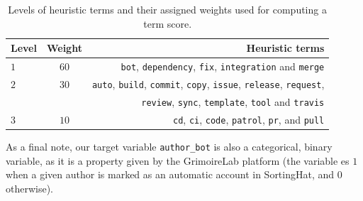 \documentclass[a4paper, 12pt]{book}
\begin{document}
\begin{table}[htb]  %
 \renewcommand{\arraystretch}{1.2}  %
 \begin{center}
  \begin{tabular}{ l c r }
    \toprule    %
    \textbf{Level} & \textbf{Weight} & \textbf{Heuristic terms} \\
    \midrule
    $1$ & $60$ & \texttt{bot}, \texttt{dependency}, \texttt{fix},  \texttt{integration} and \texttt{merge} \\
    \addlinespace
    $2$ & $30$ & \texttt{auto}, \texttt{build}, \texttt{commit}, \texttt{copy}, \texttt{issue}, \texttt{release}, \texttt{request}, \\
     & & \texttt{review}, \texttt{sync}, \texttt{template}, \texttt{tool} and \texttt{travis} \\
    \addlinespace
    $3$ & $10$ & \texttt{cd}, \texttt{ci}, \texttt{code}, \texttt{patrol}, \texttt{pr}, and \texttt{pull} \\
    \bottomrule     %
  \end{tabular}
  \caption{Levels of heuristic terms and their assigned weights used for computing a term score.}
  \label{table:levels-bot-terms}
 \end{center}
\end{table}

As a final note, our target variable \texttt{author\_bot} is also a categorical, binary variable, as it is a property given by the GrimoireLab platform (the variable es $1$ when a given author is marked as an automatic account in SortingHat, and $0$ otherwise).
\end{document}
